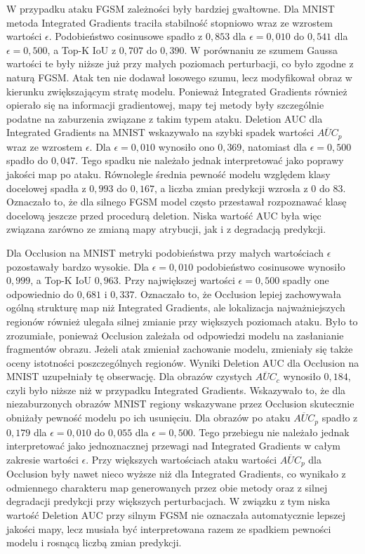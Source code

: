 W przypadku ataku FGSM zależności były bardziej gwałtowne. Dla MNIST metoda Integrated Gradients traciła stabilność stopniowo wraz ze wzrostem wartości $\epsilon$. Podobieństwo cosinusowe spadło z $0{,}853$ dla $\epsilon = 0{,}010$ do $0{,}541$ dla $\epsilon = 0{,}500$, a Top-K IoU z $0{,}707$ do $0{,}390$. W porównaniu ze szumem Gaussa wartości te były niższe już przy małych poziomach perturbacji, co było zgodne z naturą FGSM. Atak ten nie dodawał losowego szumu, lecz modyfikował obraz w kierunku zwiększającym stratę modelu. Ponieważ Integrated Gradients również opierało się na informacji gradientowej, mapy tej metody były szczególnie podatne na zaburzenia związane z takim typem ataku. Deletion AUC dla Integrated Gradients na MNIST wskazywało na szybki spadek wartości $\overline{AUC}_{p}$ wraz ze wzrostem $\epsilon$. Dla $\epsilon = 0{,}010$ wynosiło ono $0{,}369$, natomiast dla $\epsilon = 0{,}500$ spadło do $0{,}047$. Tego spadku nie należało jednak interpretować jako poprawy jakości map po ataku. Równolegle średnia pewność modelu względem klasy docelowej spadła z $0{,}993$ do $0{,}167$, a liczba zmian predykcji wzrosła z 0 do 83. Oznaczało to, że dla silnego FGSM model często przestawał rozpoznawać klasę docelową jeszcze przed procedurą deletion. Niska wartość AUC była więc związana zarówno ze zmianą mapy atrybucji, jak i z degradacją predykcji.

Dla Occlusion na MNIST metryki podobieństwa przy małych wartościach $\epsilon$ pozostawały bardzo wysokie. Dla $\epsilon = 0{,}010$ podobieństwo cosinusowe wynosiło $0{,}999$, a Top-K IoU $0{,}963$. Przy największej wartości $\epsilon = 0{,}500$ spadły one odpowiednio do $0{,}681$ i $0{,}337$. Oznaczało to, że Occlusion lepiej zachowywała ogólną strukturę map niż Integrated Gradients, ale lokalizacja najważniejszych regionów również ulegała silnej zmianie przy większych poziomach ataku. Było to zrozumiałe, ponieważ Occlusion zależała od odpowiedzi modelu na zasłanianie fragmentów obrazu. Jeżeli atak zmieniał zachowanie modelu, zmieniały się także oceny istotności poszczególnych regionów. Wyniki Deletion AUC dla Occlusion na MNIST uzupełniały tę obserwację. Dla obrazów czystych $\overline{AUC}_{c}$ wynosiło $0{,}184$, czyli było niższe niż w przypadku Integrated Gradients. Wskazywało to, że dla niezaburzonych obrazów MNIST regiony wskazywane przez Occlusion skutecznie obniżały pewność modelu po ich usunięciu. Dla obrazów po ataku $\overline{AUC}_{p}$ spadło z $0{,}179$ dla $\epsilon = 0{,}010$ do $0{,}055$ dla $\epsilon = 0{,}500$. Tego przebiegu nie należało jednak interpretować jako jednoznacznej przewagi nad Integrated Gradients w całym zakresie wartości $\epsilon$. Przy większych wartościach ataku wartości $\overline{AUC}_{p}$ dla Occlusion były nawet nieco wyższe niż dla Integrated Gradients, co wynikało z odmiennego charakteru map generowanych przez obie metody oraz z silnej degradacji predykcji przy większych perturbacjach. W związku z tym niska wartość Deletion AUC przy silnym FGSM nie oznaczała automatycznie lepszej jakości mapy, lecz musiała być interpretowana razem ze spadkiem pewności modelu i rosnącą liczbą zmian predykcji.


